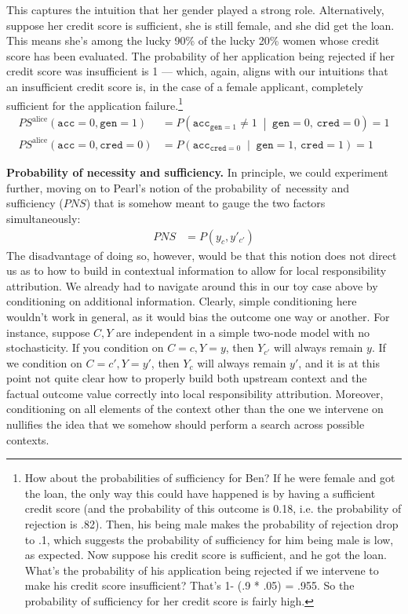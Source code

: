 \documentclass[anon,12pt]{clear2025} %
\begin{document}
This captures the intuition that her gender played a strong role. Alternatively, suppose her credit score is sufficient, she is still female, and she did get the loan. This means she's among the lucky 90\% of the lucky 20\% women whose credit score has been evaluated. The probability of her application being rejected if her credit score was insufficient is 1 --- which, again, aligns with our intuitions that an insufficient credit score is, in the case of a female applicant, completely sufficient for the application failure.\footnote{How about the probabilities of sufficiency for Ben? If he were female and got the loan, the only way this could have happened is by having a sufficient credit score (and the probability of this outcome is 0.18, i.e. the probability of rejection is  .82). Then, his being male makes the probability of rejection drop to .1, which suggests the probability of sufficiency for him being male is low, as expected. Now suppose his credit score is sufficient, and he got the loan. What's the probability of his application being rejected if we intervene to make his credit score insufficient?  That's 1- (.9 * .05) = .955. So the probability of sufficiency for her credit score is fairly high.}
\begin{align*}
\mathit{PS}^{\text{alice}}(\mathtt{acc} = 0, \mathtt{gen} = 1) 
  &= P\!\left(
      \mathtt{acc}_{\mathtt{gen} = 1} \neq 1 \;\middle|\;
      \mathtt{gen} = 0,\, \mathtt{cred} = 0
    \right) = 1 \\
\mathit{PS}^{\text{alice}}(\mathtt{acc} = 0, \mathtt{cred} = 0) 
  &= P\!\left(
      \mathtt{acc}_{\mathtt{cred} = 0} \;\middle|\;
      \mathtt{gen} = 1,\, \mathtt{cred} = 1
    \right) = 1
\end{align*}


\vspace{2mm}
\noindent \textbf{Probability of necessity and sufficiency.} In principle, we could experiment further, moving on to Pearl's notion of the probability of necessity and sufficiency ($\mathit{PNS}$) that is somehow meant to gauge the two factors simultaneously:
\begin{align*}
PNS  & =  P(y_c, y'_{c'})
\end{align*}
\noindent The disadvantage of doing so, however, would be that this notion does not direct us as to how to build in contextual information to allow for local responsibility attribution. We already had to navigate around this in our toy case above by conditioning on additional information.  Clearly, simple conditioning here wouldn't work in general, as it would bias the outcome one way or another. For instance, suppose $C, Y$ are independent in a simple two-node model with no stochasticity. If you condition on $C =c, Y = y$, then $Y_{c'}$ will always remain $y$. If we condition on $C=c', Y=y'$, then $Y_{c}$ will always remain $y'$, and it is at this point not quite clear how to properly build both upstream context and the factual outcome value correctly into local responsibility attribution. Moreover, conditioning on all elements of the context other than the one we intervene on nullifies the idea that we somehow should perform a search across possible contexts.
\end{document}
